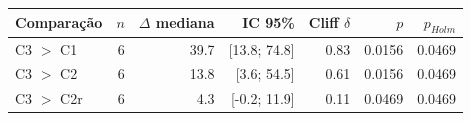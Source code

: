 \begin{tabular}{lrrrrrr}
\toprule
Comparação & $n$ & $\Delta$ mediana & IC 95\% & Cliff $\delta$ & $p$ & $p_{Holm}$ \\
\midrule
C3 $>$ C1 & 6 & 39.7 & [13.8; 74.8] & 0.83 & 0.0156 & 0.0469 \\
C3 $>$ C2 & 6 & 13.8 & [3.6; 54.5] & 0.61 & 0.0156 & 0.0469 \\
C3 $>$ C2r & 6 & 4.3 & [-0.2; 11.9] & 0.11 & 0.0469 & 0.0469 \\
\bottomrule
\end{tabular}
